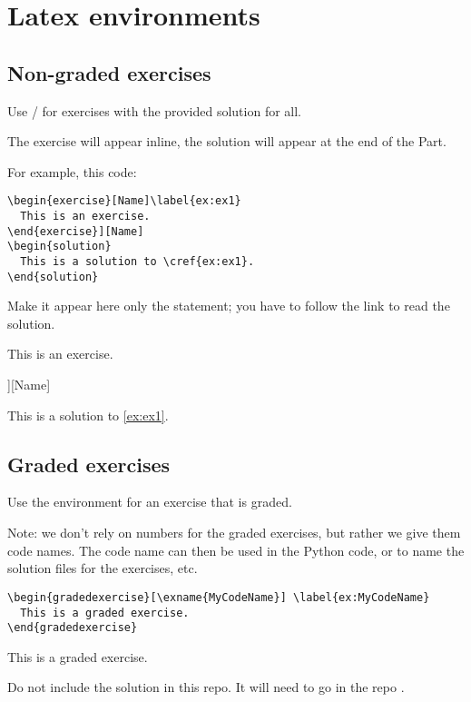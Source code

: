 
\section{Latex environments}

\subsection{Non-graded exercises}

Use / for exercises with the provided solution for all.

The exercise will appear inline, the solution will appear at the end of the Part.

For example, this code:

\begin{verbatim}
\begin{exercise}[Name]\label{ex:ex1}
  This is an exercise.
\end{exercise}][Name]
\begin{solution}
  This is a solution to \cref{ex:ex1}.
\end{solution}
\end{verbatim}

Make it appear here only the statement; you have to follow the link to read the solution.

\begin{exercise}[Name]\label{ex:ex1}
  This is an exercise.
\end{exercise}][Name]
\begin{solution}
  This is a solution to \cref{ex:ex1}.
\end{solution}

\subsection{Graded exercises}

Use the environment  for an exercise that is graded.

Note: we don't rely on numbers for the graded exercises, but rather we give them code names.
The code name can then be used in the Python code, or to name the solution files for the exercises, etc.

\begin{verbatim}
\begin{gradedexercise}[\exname{MyCodeName}] \label{ex:MyCodeName}
  This is a graded exercise.
\end{gradedexercise}
\end{verbatim}


\begin{gradedexercise} 
  This is a graded exercise.
\end{gradedexercise}


Do not include the solution in this repo. It will need to go in the repo
. 


